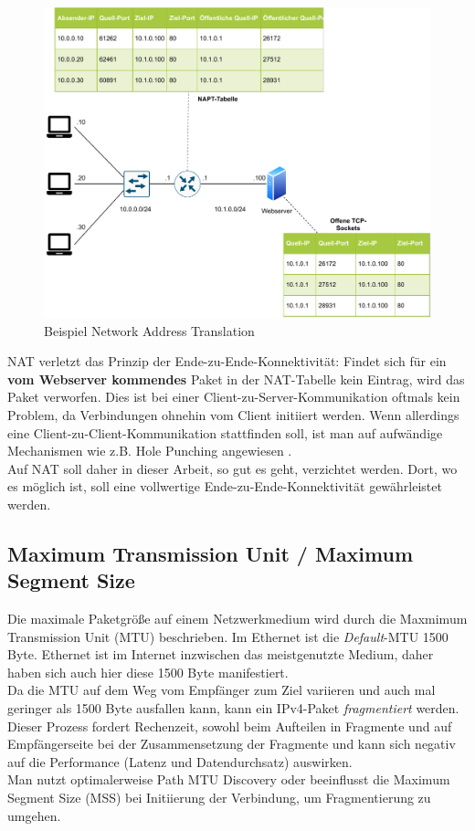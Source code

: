 \begin{figure}[h]
  \centering
  \includegraphics{Figures/napt.pdf}
  \caption{Beispiel Network Address Translation}
  \label{grafik: napt}
\end{figure}\FloatBarrier

NAT verletzt das Prinzip der Ende-zu-Ende-Konnektivität: Findet sich für ein \textbf{vom Webserver kommendes} Paket in der NAT-Tabelle kein Eintrag, wird das Paket verworfen. Dies ist bei einer Client-zu-Server-Kommunikation oftmals kein Problem, da Verbindungen ohnehin vom Client initiiert werden. Wenn allerdings eine Client-zu-Client-Kommunikation stattfinden soll, ist man auf aufwändige Mechanismen wie z.B. Hole Punching angewiesen \cite[S.317]{Fall2011}.\\
Auf NAT soll daher in dieser Arbeit, so gut es geht, verzichtet werden. Dort, wo es möglich ist, soll eine vollwertige Ende-zu-Ende-Konnektivität gewährleistet werden.

\subsection{Maximum Transmission Unit / Maximum Segment Size}
Die maximale Paketgröße auf einem Netzwerkmedium wird durch die Maxmimum Transmission Unit (MTU) beschrieben. Im Ethernet ist die \textit{Default}-MTU 1500 Byte.\cite[S.86]{Fall2011} Ethernet ist im Internet inzwischen das meistgenutzte Medium, daher haben sich auch hier diese 1500 Byte manifestiert.\\
Da die MTU auf dem Weg vom Empfänger zum Ziel variieren und auch mal geringer als 1500 Byte ausfallen kann, kann ein IPv4-Paket \textit{fragmentiert} werden. Dieser Prozess fordert Rechenzeit, sowohl beim Aufteilen in Fragmente und auf Empfängerseite bei der Zusammensetzung der Fragmente und kann sich negativ auf die Performance (Latenz und Datendurchsatz) auswirken.\\
Man nutzt optimalerweise Path MTU Discovery oder beeinflusst die Maximum Segment Size (MSS) bei Initiierung der Verbindung, um Fragmentierung zu umgehen.

